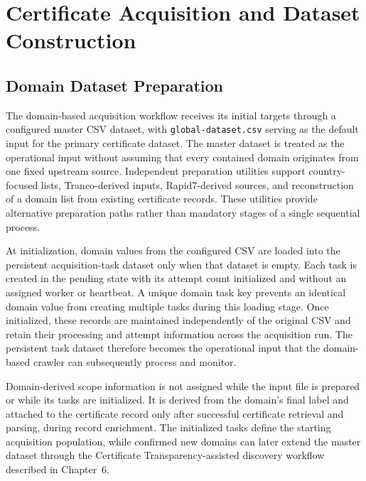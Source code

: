 
\chapter{Certificate Acquisition and Dataset Construction}
\label{chap:certificate-acquisition}

\section{Domain Dataset Preparation}
\label{sec:domain-dataset-preparation}

The domain-based acquisition workflow receives its initial targets through a
configured master CSV dataset, with \texttt{global-dataset.csv} serving as the
default input for the primary certificate dataset. The master dataset is
treated as the operational input without assuming that every contained domain
originates from one fixed upstream source. Independent preparation utilities
support country-focused lists,
Tranco-derived inputs, Rapid7-derived sources, and reconstruction of a domain
list from existing certificate records. These utilities provide alternative
preparation paths rather than mandatory stages of a single sequential process.

At initialization, domain values from the configured CSV are loaded into the
persistent acquisition-task dataset only when that dataset is empty. Each task
is created in the pending state with its attempt count initialized and without
an assigned worker or heartbeat. A unique domain task key prevents an identical
domain value from creating multiple tasks during this loading stage. Once
initialized, these records are maintained independently of the original CSV
and retain their processing and attempt information across the acquisition
run. The persistent task dataset therefore becomes the operational input that
the domain-based crawler can subsequently process and monitor.

Domain-derived scope information is not assigned while the input file is
prepared or while its tasks are initialized. It is derived from the domain's
final label and attached to the certificate record only after successful
certificate retrieval and parsing, during record enrichment. The initialized
tasks define the starting acquisition population, while confirmed new domains
can later extend the master dataset through the Certificate
Transparency-assisted discovery workflow described in Chapter~6.

